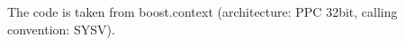 \label{appendixb}

The code is taken from boost.context\cite{bcontext} (architecture: PPC 32bit,
calling convention: SYSV).

